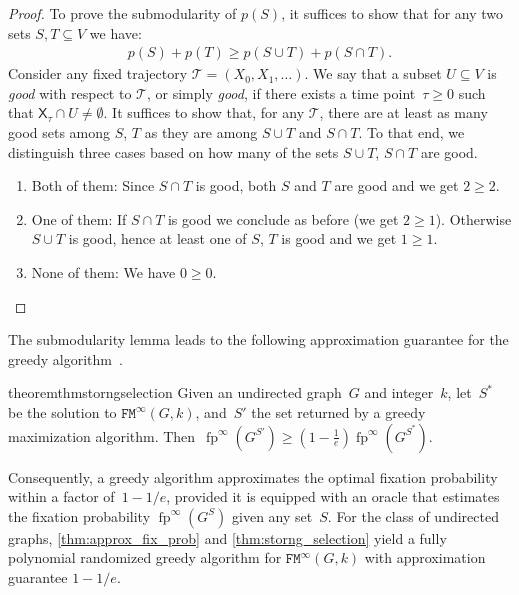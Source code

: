 \documentclass[letterpaper]{article}
\newcommand{\X}{\mathsf{X}}
\newcommand{\fp}{\operatorname{fp}}
\newcommand{\Traj}{\mathcal{T}}
\newcommand{\NodeActivationMoranStrong}{\texttt{FM}^{\infty}}
\begin{document}
\begin{proof}
To prove the submodularity of $p(S)$, it suffices to show that for any two sets $S,T\subseteq V$ we have:
\begin{align}
p(S)+p(T)\ge p(S\cup T) + p(S\cap T).
\end{align}
Consider any fixed trajectory $\Traj = (X_0,X_1,\dots)$.
We say that a subset $U\subseteq V$ is \emph{good} with respect to $\Traj$, or simply \emph{good}, if there exists a time point~$\tau\ge 0$ such that $\X_{\tau}\cap U\ne\emptyset$. It suffices to show that, for any $\Traj$, there are at least as many good sets among $S$, $T$ as they are among $S\cup T$ and $S\cap T$. To that end, we distinguish three cases based on how many of the sets $S\cup T$, $S\cap T$ are good.
\begin{enumerate}
\item Both of them: Since $S\cap T$ is good, both $S$ and $T$ are good and we get $2\ge 2$.
\item One of them: If $S\cap T$ is good we conclude as before (we get $2\ge 1$).
Otherwise $S\cup T$ is good, hence at least one of $S$, $T$ is good and we get $1\ge 1$.
\item None of them: We have $0\ge 0$. \qedhere
\end{enumerate}
\end{proof}

The submodularity lemma leads to the following approximation guarantee for the greedy algorithm~\cite{Nemhauser1978,Krause2014}.

\begin{restatable}{theorem}{thmstorngselection}\label{thm:storng_selection}
Given an undirected graph~$G$ and integer~$k$, let~$S^*$ be the solution to $\NodeActivationMoranStrong(G,k)$, and~$S'$ the set returned by a greedy maximization algorithm.
Then~$\fp^{\infty}(G^{S'})\geq \left(1-\frac{1}{e}\right)\fp^{\infty}(G^{S^*})$.
\end{restatable}


Consequently, a greedy algorithm approximates the optimal fixation probability within a factor of~$1-1/e$, provided it is equipped with an oracle that estimates the fixation probability $\fp^{\infty}(G^{S})$ given any set~$S$.
For the class of undirected graphs, \cref{thm:approx_fix_prob} and \cref{thm:storng_selection} yield a fully polynomial randomized greedy algorithm for $\NodeActivationMoranStrong(G,k)$ with approximation guarantee $1-1/e$.
\end{document}
